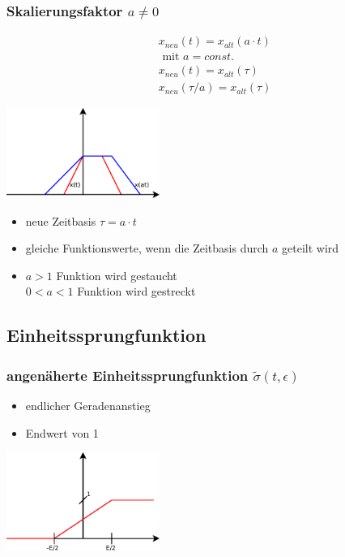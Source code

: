 \subsubsection*{Skalierungsfaktor \texorpdfstring{$a \neq 0$}{}}
\begin{multicols}{2}
\begin{align*}
  &x_{neu}\left(t\right) = x_{alt}\left(a \cdot t\right) \\
  &\text{ mit } a = const.\\
  &x_{neu}\left(t\right) = x_{alt}\left(\tau\right)\\
  &x_{neu}\left(\tau / a\right) = x_{alt}\left(\tau\right)
\end{align*}
\vfill
\begin{center}
 \includegraphics[width=50mm,keepaspectratio=true]{./Elektrotechnik/Bilder/skalierungsfaktor.pdf}
\end{center}

\end{multicols}
\begin{itemize}
 \item neue Zeitbasis \(\tau = a \cdot t\)
 \item gleiche Funktionswerte, wenn die Zeitbasis durch \(a\) geteilt wird
 \item \(a > 1\) Funktion wird gestaucht\\
       \(0 < a < 1\) Funktion wird gestreckt 
\end{itemize}

\subsection*{Einheitssprungfunktion}
\subsubsection*{angenäherte Einheitssprungfunktion
\texorpdfstring{$\tilde{\sigma}\left(t, \epsilon \right)$}{}}
\begin{multicols}{2}
 \begin{itemize}
  \item endlicher Geradenanstieg
  \item Endwert von 1
 \end{itemize}
\vfill
\begin{center}
 \includegraphics[width=50mm,keepaspectratio=true]{./Elektrotechnik/Bilder/einheitssprungang.pdf}
\end{center}
\vfill
\end{multicols}

